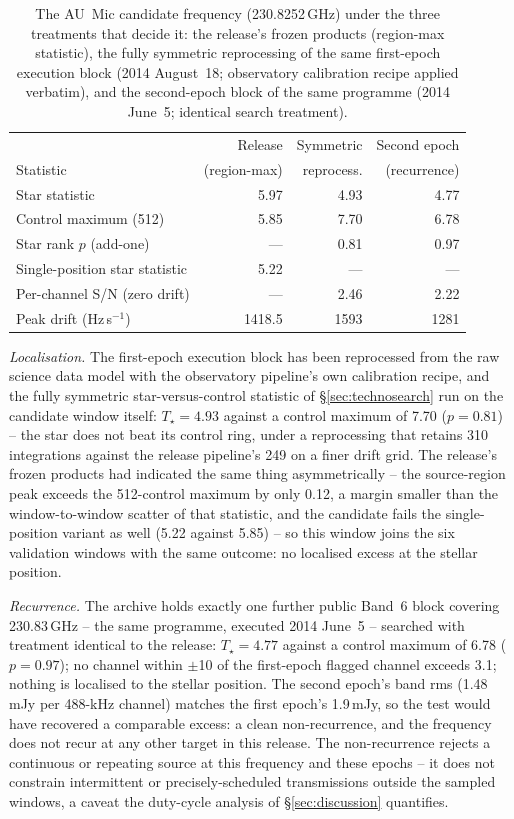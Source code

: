 \documentclass{openjournal}
\begin{document}
\begin{table}
\centering
\small
\setlength{\tabcolsep}{4pt}
\caption{The AU~Mic candidate frequency (230.8252\,GHz) under the
three treatments that decide it: the release's frozen products
(region-max statistic), the fully symmetric reprocessing of the same
first-epoch execution block (2014 August~18; observatory calibration
recipe applied verbatim), and the second-epoch block of the same
programme (2014 June~5; identical search treatment).}
\label{tab:aumic}
\begin{tabular}{@{}lrrr@{}}
\toprule
 & Release & Symmetric & Second epoch \\
Statistic & (region-max) & reprocess. & (recurrence) \\
\midrule
Star statistic & 5.97 & 4.93 & 4.77 \\
Control maximum (512) & 5.85 & 7.70 & 6.78 \\
Star rank $p$ (add-one) & --- & 0.81 & 0.97 \\
Single-position star statistic & 5.22 & --- & --- \\
Per-channel S/N (zero drift) & --- & 2.46 & 2.22 \\
Peak drift (Hz\,s$^{-1}$) & 1418.5 & 1593 & 1281 \\
\bottomrule
\end{tabular}
\end{table}

\emph{Localisation.} The first-epoch execution block has been
reprocessed from the raw science data model with the observatory
pipeline's own calibration recipe, and the fully symmetric
star-versus-control statistic of \S\ref{sec:technosearch} run on the
candidate window itself: $T_\star=4.93$ against a control maximum of
7.70 ($p=0.81$) -- the star does not beat its control ring, under a
reprocessing that retains 310 integrations against the release
pipeline's 249 on a finer drift grid. The release's frozen products
had indicated the same thing asymmetrically -- the source-region peak
exceeds the 512-control maximum by only 0.12, a margin smaller than
the window-to-window scatter of that statistic, and the candidate
fails the single-position variant as well (5.22 against 5.85) -- so
this window joins the six validation windows with the same outcome:
no localised excess at the stellar position.

\emph{Recurrence.} The archive holds exactly one further public
Band~6 block covering 230.83\,GHz -- the same programme, executed
2014 June~5 -- searched with treatment identical to the release:
$T_\star=4.77$ against a control maximum of 6.78 ($p=0.97$); no
channel within $\pm$10 of the first-epoch flagged channel exceeds
3.1; nothing is localised to the stellar position. The second
epoch's band rms (1.48\,mJy per 488-kHz channel) matches the first
epoch's 1.9\,mJy, so the test would have recovered a comparable
excess: a clean non-recurrence, and the frequency does not recur at
any other target in this release. The non-recurrence rejects a
continuous or repeating source at this frequency and these epochs --
it does not constrain intermittent or precisely-scheduled
transmissions outside the sampled windows, a caveat the duty-cycle
analysis of \S\ref{sec:discussion} quantifies.
\end{document}
